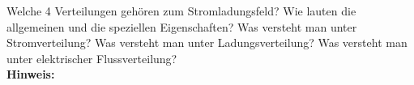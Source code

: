 \begin{question}[section=2,subsection=21,name={Strom-Ladungsfeld},difficulty=9,type=mdl,tags={}]
	Welche 4 Verteilungen gehören zum Stromladungsfeld? Wie lauten die allgemeinen und die speziellen Eigenschaften? Was versteht man unter Stromverteilung? Was versteht man unter Ladungsverteilung? Was versteht man unter elektrischer Flussverteilung?
	\\ \textbf{Hinweis:}\\
	
\end{question}
\begin{solution}
	
\end{solution}
